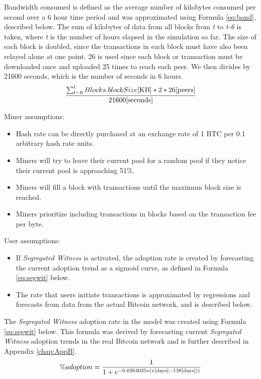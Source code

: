 \documentclass[12pt]{report}
\begin{document}
Bandwidth consumed is defined as the average number of kilobytes consumed per second over a 6 hour time period and was approximated using Formula \ref{eq:band}, described below. The sum of kilobytes of data from all blocks from \textit{t} to \textit{t-6} is taken, where \textit{t} is the number of hours elapsed in the simulation so far. The size of each block is doubled, since the transactions in each block must have also been relayed alone at one point. 26 is used since each block or transaction must be downloaded once and uploaded 25 times to reach each peer. We then divides by 21600 seconds, which is the number of seconds in 6 hours.
\begin{equation} \label{eq:band}
\frac{\sum_{t-6}^{t} Blocks.blockSize \textup{[KB]}*2*26 \textup{[peers]}}{21600 \textup{[seconds]}}
\end{equation}

Miner assumptions:
\begin{itemize}
\item Hash rate can be directly purchased at an exchange rate of 1 BTC per 0.1 arbitrary hash rate units.
\item Miners will try to leave their current pool for a random pool if they notice their current pool is approaching 51\%.
\item Miners will fill a block with transactions until the maximum block size is reached.
\item Miners prioritize including transactions in blocks based on the transaction fee per byte.
\end{itemize}

User assumptions:
\begin{itemize}
\item If \textit{Segregated Witness} is activated, the adoption rate is created by forecasting the current adoption trend as a sigmoid curve, as defined in Formula \ref{eq:segwit} below.
\item The rate that users initiate transactions is approximated by regressions and forecasts from data from the actual Bitcoin network, and is described below.
\end{itemize}

The \textit{Segregated Witness} adoption rate in the model was created using Formula \ref{eq:segwit} below. This formula was derived by forecasting current \textit{Segregated Witness} adoption trends in the real Bitcoin network \cite{segwit.party.} and is further described in Appendix \autoref{chap:AppB}.
\begin{equation} \label{eq:segwit}
\% adoption = \frac{1}{1+e^{-0.0264025*(x \textup{[days]}-138 \textup{[days]}))}}
\end{equation}
\end{document}
